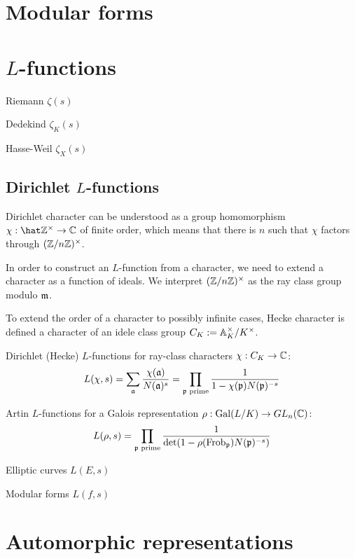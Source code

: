 \documentclass{../../large}
\DeclareMathOperator{\Frob}{Frob}
\begin{document}
\chapter{Modular forms}




\chapter{$L$-functions}
Riemann $\zeta(s)$

Dedekind $\zeta_K(s)$

Hasse-Weil $\zeta_X(s)$

\section{Dirichlet $L$-functions}

\begin{prb}
Dirichlet character can be understood as a group homomorphism $\chi:\hat\Z^\times\to\C$ of finite order, which means that there is $n$ such that $\chi$ factors through $(\mathbb{Z}/n\mathbb{Z})^\times$.

In order to construct an $L$-function from a character, we need to extend a character as a function of ideals.
We interpret $(\mathbb{Z}/n\mathbb{Z})^\times$ as the ray class group modulo $\mathfrak{m}$.

To extend the order of a character to possibly infinite cases, Hecke character is defined a character of an idele class group $C_K:=\mathbb{A}_K^\times/K^\times$.
\end{prb}


Dirichlet (Hecke) $L$-functions for ray-class characters $\chi:C_K\to\mathbb{C}$:
\[L(\chi,s)=\sum_{\mathfrak{a}}\frac{\chi(\mathfrak{a})}{N(\mathfrak{a})^s}=\prod_{\mathfrak{p}\text{ prime}}\frac1{1-\chi(\mathfrak{p})N(\mathfrak{p})^{-s}}\]

Artin $L$-functions for a Galois representation $\rho:\operatorname{Gal}(L/K)\to GL_n(\mathbb{C})$:
\[L(\rho,s)=\prod_{\fp\text{ prime}}\frac1{\det(1-\rho(\Frob_\fp)N(\fp)^{-s})}\]

Elliptic curves $L(E,s)$

Modular forms $L(f,s)$


\chapter{Automorphic representations}
\end{document}

